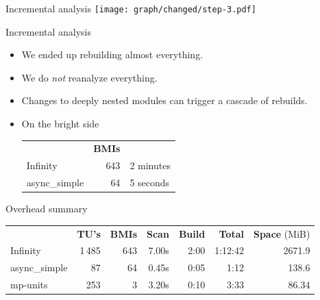 \documentclass[aspectratio=169]{beamer}
\begin{document}
\begin{frame}{Incremental analysis }
  \texttt{[image: graph/changed/step-3.pdf]}
\end{frame}


\begin{frame}{Incremental analysis}
  \begin{itemize}
    \item We ended up rebuilding almost everything.
    \item We do \emph{not} reanalyze everything.
    \item Changes to deeply nested modules can trigger a cascade of rebuilds.
    \item On the bright side
          \begin{table}
            \begin{tabular}{l r l}
                            & \textbf{BMIs} &           \\
              Infinity      & 643           & 2 minutes \\
              async\_simple & 64            & 5 seconds
            \end{tabular}
          \end{table}
  \end{itemize}
\end{frame}

\begin{frame}{Overhead summary}
  \footnotesize\begin{table}
    \begin{tabular}{l r r r r r r}
                    & \textbf{TU's} & \textbf{BMIs} & \textbf{Scan} & \textbf{Build} & \textbf{Total} & \textbf{Space} (MiB) \\
      Infinity      & 1\,485        & 643           & 7.00s         & 2:00           & 1:12:42        & 2671.9               \\
      async\_simple & 87            & 64            & 0.45s         & 0:05           & 1:12           & 138.6                \\
      mp-units      & 253           & 3             & 3.20s         & 0:10           & 3:33           & 86.34
    \end{tabular}
  \end{table}
\end{frame}
\end{document}
